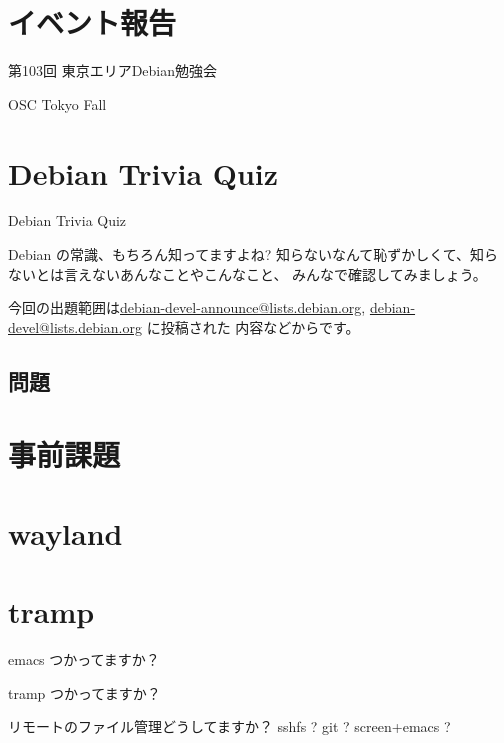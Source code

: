 \section{イベント報告}

\begin{frame}{第103回 東京エリアDebian勉強会}
\end{frame}

\begin{frame}{OSC Tokyo Fall}
\end{frame}

\section{Debian Trivia Quiz}
\begin{frame}{Debian Trivia Quiz}

  Debian の常識、もちろん知ってますよね?
知らないなんて恥ずかしくて、知らないとは言えないあんなことやこんなこと、
みんなで確認してみましょう。

今回の出題範囲は\url{debian-devel-announce@lists.debian.org},
\url{debian-devel@lists.debian.org} に投稿された
内容などからです。

\end{frame}

\subsection{問題}
 

\section{事前課題}

{\footnotesize
 
}

\section{wayland}

\section{tramp}

\begin{frame}{}
 
emacs つかってますか？

tramp つかってますか？

リモートのファイル管理どうしてますか？ sshfs ? git ? screen+emacs ? 

\end{frame}

